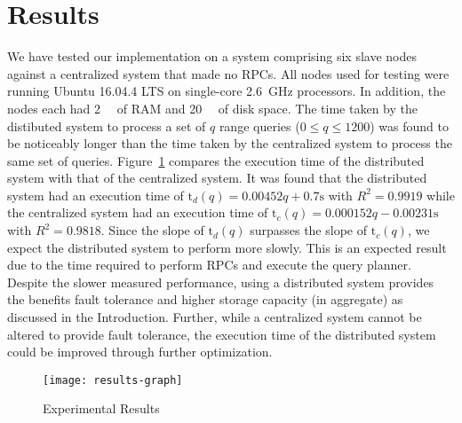 \section{Results}
We have tested our implementation on a system comprising six slave nodes
against a centralized system that made no RPCs. All nodes used for testing were
running Ubuntu 16.04.4 LTS on single-core \SI{2.6}{\giga\hertz} processors. In
addition, the nodes each had \SI{2}{\gibi\byte} of RAM and \SI{20}{\gibi\byte}
of disk space. The time taken by the distibuted system to process a set of
\(q\) range queries (\(0 \leq q \leq 1200\)) was found to be noticeably longer
than the time taken by the centralized system to process the same set of
queries. Figure~\ref{fig:graph-of-results} compares the execution time of the
distributed system with that of the centralized system. It was found that the
distributed system had an execution time of
\(\mathrm{t}_d(q) = 0.00452 q + 0.7 \mathrm{s}\)
with \(R^2 = 0.9919\) while the centralized system had an execution time of
\(\mathrm{t}_c(q) = 0.000152 q - 0.00231 \mathrm{s}\)
with \(R^2 = 0.9818\). Since the slope of \(\mathrm{t}_d(q)\) surpasses the
slope of \(\mathrm{t}_c(q)\), we expect the distributed system to perform more
slowly. This is an expected result due to the time required to perform RPCs and
execute the query planner. Despite the slower measured performance, using a
distributed system provides the benefits fault tolerance and higher storage
capacity (in aggregate) as discussed in the Introduction. Further, while a
centralized system cannot be altered to provide fault tolerance, the execution
time of the distributed system could be improved through further optimization.
%
\begin{figure}
    \centering
    \texttt{[image: results-graph]}
    \caption{Experimental Results}\label{fig:graph-of-results}
\end{figure}

